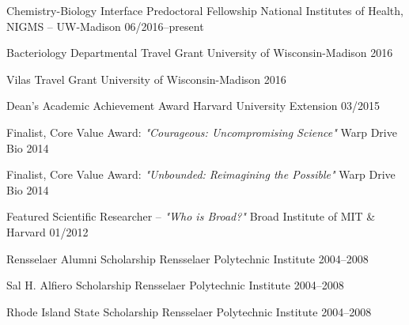 \newpage




\begin{cvhonors}

  \cvhonor
    {Chemistry-Biology Interface Predoctoral Fellowship} %
    {National Institutes of Health, NIGMS -- UW-Madison} %
    {06/2016--present} %

  \cvhonor
    {Bacteriology Departmental Travel Grant} %
    {University of Wisconsin-Madison} %
    {2016} %

  \cvhonor
    {Vilas Travel Grant} %
    {University of Wisconsin-Madison} %
    {2016} %

  \cvhonor
    {Dean's Academic Achievement Award} %
    {Harvard University Extension} %
    {03/2015} %

  \cvhonor
    {Finalist, Core Value Award: \textit{"Courageous: Uncompromising Science"}} %
    {Warp Drive Bio} %
    {2014} %
    
  \cvhonor
    {Finalist, Core Value Award: \textit{"Unbounded: Reimagining the Possible"}} %
    {Warp Drive Bio} %
    {2014} %

  \cvhonor
    {Featured Scientific Researcher -- \textit{"Who is Broad?"}} %
    {Broad Institute of MIT \& Harvard} %
    {01/2012} %
    
  \cvhonor
    {Rensselaer Alumni Scholarship} %
    {Rensselaer Polytechnic Institute} %
    {2004--2008} %

  \cvhonor
    {Sal H. Alfiero Scholarship} %
    {Rensselaer Polytechnic Institute} %
    {2004--2008} %

  \cvhonor
    {Rhode Island State Scholarship} %
    {Rensselaer Polytechnic Institute} %
    {2004--2008} %

\end{cvhonors}